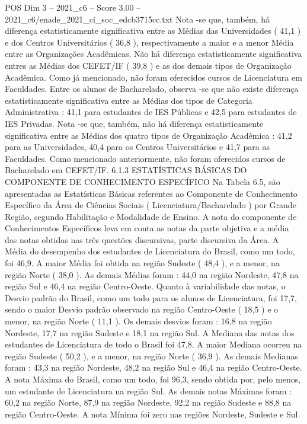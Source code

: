 \begin{textsample}{POS Dim 3 – 2021\_c6 – Score 3.00 – 2021\_c6/enade\_2021\_ci\_soc\_edcb3715cc.txt}
Nota -se que, também, há diferença estatisticamente significativa entre as Médias das Universidades ( 41,1 ) e dos Centros Universitários ( 36,8 ), respectivamente a maior e a menor Média entre as Organizações Acadêmicas.
Não há diferença estatisticamente significativa entres as Médias dos CEFET/IF ( 39,8 ) e as dos demais tipos de Organização Acadêmica.
Como já mencionado, não foram oferecidos cursos de Licenciatura em Faculdades.
Entre os alunos de Bacharelado, observa -se que não existe diferença estatisticamente significativa entre as Médias dos tipos de Categoria Administrativa : 41,1 para estudantes de IES Públicas e 42,5 para estudantes de IES Privadas.
Nota -se que, também, não há diferença estatisticamente significativa entre as Médias dos quatro tipos de Organização Acadêmica : 41,2 para as Universidades, 40,4 para os Centros Universitários e 41,7 para as Faculdades.
Como mencionado anteriormente, não foram oferecidos cursos de Bacharelado em CEFET/IF. 6.1.3 ESTATÍSTICAS BÁSICAS DO COMPONENTE DE CONHECIMENTO ESPECÍFICO Na Tabela 6.5, são apresentadas as Estatísticas Básicas referentes ao Componente de Conhecimento Específico da Área de Ciências Sociais ( Licenciatura/Bacharelado ) por Grande Região, segundo Habilitação e Modalidade de Ensino.
A nota do componente de Conhecimentos Específicos leva em conta as notas da parte objetiva e a média das notas obtidas nas três questões discursivas, parte discursiva da Área.
A Média do desempenho dos estudantes de Licenciatura do Brasil, como um todo, foi 46,9.
A maior Média foi obtida na região Sudeste ( 48,4 ), e a menor, na região Norte ( 38,0 ).
As demais Médias foram : 44,0 na região Nordeste, 47,8 na região Sul e 46,4 na região Centro-Oeste.
Quanto à variabilidade das notas, o Desvio padrão do Brasil, como um todo para os alunos de Licenciatura, foi 17,7, sendo o maior Desvio padrão observado na região Centro-Oeste ( 18,5 ) e o menor, na região Norte ( 11,1 ).
Os demais desvios foram : 16,8 na região Nordeste, 17,7 na região Sudeste e 18,1 na região Sul.
A Mediana das notas dos estudantes de Licenciatura de todo o Brasil foi 47,8.
A maior Mediana ocorreu na região Sudeste ( 50,2 ), e a menor, na região Norte ( 36,9 ).
As demais Medianas foram : 43,3 na região Nordeste, 48,2 na região Sul e 46,4 na região Centro-Oeste.
A nota Máxima do Brasil, como um todo, foi 96,3, sendo obtida por, pelo menos, um estudante de Licenciatura na região Sul.
As demais notas Máximas foram : 60,2 na região Norte, 87,9 na região Nordeste, 92,2 na região Sudeste e 88,8 na região Centro-Oeste.
A nota Mínima foi zero nas regiões Nordeste, Sudeste e Sul.

\end{textsample}
